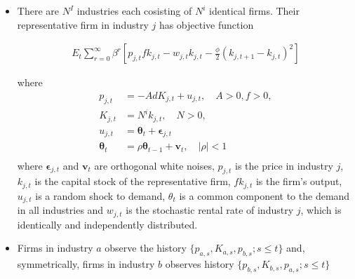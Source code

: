\documentclass[11pt]{article}
\numberwithin{equation}{section}
\begin{document}
	\begin{itemize}
		\item There are $N^I$ industries each cosisting of $N^i$ identical firms. Their representative firm in industry $j$ has objective function 
		
		\begin{align*}
		E_t \sum_{r=0}^{\infty} \beta^r \left[p_{j,t} f k_{j,t} -w_{j,t} k_{j,t} - \frac{\phi}{2}\left(k_{j,t+1}-k_{j,t} \right)^2 \right]
		\end{align*}
		
		where 
		\begin{align*}
		p_{j,t} & = -A d K_{j,t} + u_{j,t},\quad A>0, f>0,\\
		K_{j,t} & = N^i k_{j,t}, \quad N>0,\\
		u_{j,t} & = \mathbf{\theta}_t + \mathbf{\epsilon}_{j,t} \\
		\mathbf{\theta}_t & = \rho \mathbf{\theta}_{t-1}+\mathbf{v}_t,\quad  |\rho| <1 \\ 
		\end{align*}
		where $\mathbf{\epsilon}_{j,t}$ and $\mathbf{v}_t$ are orthogonal white noises, $p_{j,t}$ is the price in industry $j$, $k_{j,t}$ is the capital stock of the representative firm, $f k_{j,t}$ is the firm's output, $u_{j,t}$ is a random shock to demand, $\theta_t$ is a common component to the demand in all industries and $w_{j,t}$ is the stochastic rental rate of industry $j$, which is identically and independently distributed. 
		
		\item Firms in industry $a$ observe the history $\{p_{a,s}, K_{a,s}, p_{b,s};s\leq t\} $ and, symmetrically, firms in industry $b$ observes history $\{p_{b,s}, K_{b,s}, p_{a,s};s\leq t\} $
	\end{itemize}

	
\end{document}
